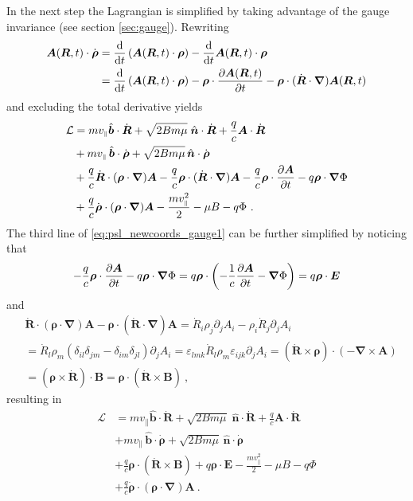 \documentclass{scrartcl}
\renewcommand{\vec}[1]{\boldsymbol{#1}}
\newcommand{\uv}[1]{\hat{\vec{#1}}}
\newcommand{\bnabla}{\vec{\nabla}}
\newcommand{\rvgc}{\vec{R}} %
\newcommand{\rgc}{R}
\newcommand{\PSL}{\mathcal{L}}
\newcommand{\subparallel}{{\scriptscriptstyle\parallel}}
\begin{document}
In the next step the Lagrangian is simplified by taking advantage of the gauge invariance (see section \ref{sec:gauge}). Rewriting
\begin{align*}
\vec{A}(\rvgc,t)\cdot\dot{\vec{\rho}} &= \dv{t}\left(\vec{A}(\rvgc,t)\cdot\vec{\rho}\right) - \dv{t}\vec{A}(\rvgc,t)\cdot\vec{\rho} \\
&= \dv{t}\left(\vec{A}(\rvgc,t)\cdot\vec{\rho}\right) - \vec{\rho}\cdot\pdv{\vec{A}(\rvgc,t)}{t} - \vec{\rho}\cdot(\dot{\rvgc}\cdot\bnabla)\vec{A}(\rvgc,t)
\end{align*}
and excluding the total derivative yields
\begin{align}
\PSL &= mv_\subparallel \uv{b}\cdot\dot{\rvgc} + \sqrt{2Bm\mu}\;\uv{n}\cdot\dot{\rvgc} + \frac{q}{c}\vec{A}\cdot\dot{\rvgc} \nonumber\\
& + mv_\subparallel\,\uv{b}\cdot\dot{\vec{\rho}} + \sqrt{2Bm\mu}\,\uv{n}\cdot\dot{\vec{\rho}} \\
& + \frac{q}{c}\dot{\rvgc}\cdot(\vec{\rho}\cdot\bnabla)\vec{A} - \frac{q}{c}\vec{\rho}\cdot(\dot{\rvgc}\cdot\bnabla)\vec{A} - \frac{q}{c}\vec{\rho}\cdot\pdv{\vec{A}}{t} - q\vec{\rho}\cdot\bnabla\Phi \nonumber\\
& + \frac{q}{c}\dot{\vec{\rho}}\cdot(\vec{\rho}\cdot\bnabla)\vec{A} - \frac{m v_\subparallel^2}{2} - \mu B - q\Phi  \ . \label{eq:psl_newcoords_gauge1}
\end{align}
The third line of \eqref{eq:psl_newcoords_gauge1} can be further simplified by noticing that
\begin{equation*}
-\frac{q}{c}\vec{\rho}\cdot\pdv{\vec{A}}{t} - q\vec{\rho}\cdot\bnabla\Phi = q\vec{\rho}\cdot\left(-\frac{1}{c}\pdv{\vec{A}}{t}-\bnabla\Phi\right) = q\vec{\rho}\cdot\vec{E}
\end{equation*}
and
\begin{align*}
&\dot{\rvgc}\cdot(\vec{\rho}\cdot\bnabla)\vec{A} - \vec{\rho}\cdot(\dot{\rvgc}\cdot\bnabla)\vec{A} = \dot{\rgc}_i\rho_j\partial_jA_i - \rho_i\dot{\rgc}_j\partial_jA_i \\
&= \dot{\rgc}_l\rho_m(\delta_{il}\delta_{jm}-\delta_{im}\delta_{jl})\partial_jA_i = \varepsilon_{lmk}\dot{\rgc}_l\rho_m\varepsilon_{ijk}\partial_jA_i = (\dot{\rvgc}\times\vec{\rho})\cdot(-\bnabla\times\vec{A}) \\
&= (\vec{\rho}\times\dot{\rvgc})\cdot\vec{B} = \vec{\rho}\cdot(\dot{\rvgc}\times\vec{B}) \ ,
\end{align*}
resulting in
\begin{align}
\PSL &= mv_\subparallel \uv{b}\cdot\dot{\rvgc} + \sqrt{2Bm\mu}\;\uv{n}\cdot\dot{\rvgc} + \frac{q}{c}\vec{A}\cdot\dot{\rvgc} \nonumber\\
& + mv_\subparallel\,\uv{b}\cdot\dot{\vec{\rho}} + \sqrt{2Bm\mu}\,\uv{n}\cdot\dot{\vec{\rho}} \\
& + \frac{q}{c}\vec{\rho}\cdot(\dot{\rvgc}\times\vec{B}) + q\vec{\rho}\cdot\vec{E} - \frac{m v_\subparallel^2}{2} - \mu B - q\Phi \nonumber\\
&+ \frac{q}{c}\dot{\vec{\rho}}\cdot(\vec{\rho}\cdot\bnabla)\vec{A} \ . \label{eq:psl_newcoords_gauge2}
\end{align}
\end{document}
